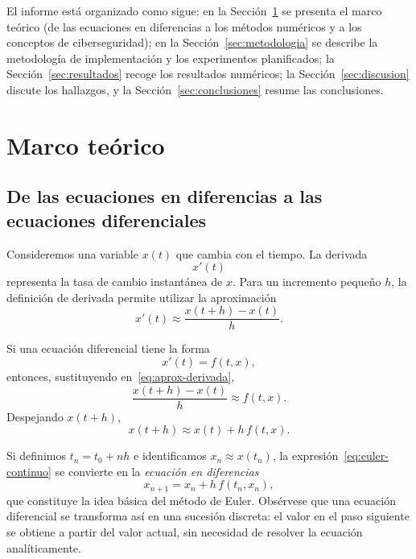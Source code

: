 \documentclass[11pt,a4paper]{article}
\begin{document}
El informe está organizado como sigue: en la Sección~\ref{sec:marco} se
presenta el marco teórico (de las ecuaciones en diferencias a los métodos
numéricos y a los conceptos de ciberseguridad); en la
Sección~\ref{sec:metodologia} se describe la metodología de implementación y
los experimentos planificados; la Sección~\ref{sec:resultados} recoge los
resultados numéricos; la Sección~\ref{sec:discusion} discute los hallazgos, y
la Sección~\ref{sec:conclusiones} resume las conclusiones.

\section{Marco teórico}
\label{sec:marco}

\subsection{De las ecuaciones en diferencias a las ecuaciones diferenciales}
\label{sec:marco-diferencias}

Consideremos una variable $x(t)$ que cambia con el tiempo. La derivada
\begin{equation}
  x'(t)
\end{equation}
representa la tasa de cambio instantánea de $x$. Para un incremento pequeño
$h$, la definición de derivada permite utilizar la aproximación
\begin{equation}
  x'(t) \approx \frac{x(t+h) - x(t)}{h}.
  \label{eq:aprox-derivada}
\end{equation}

Si una ecuación diferencial tiene la forma
\begin{equation}
  x'(t) = f(t, x),
  \label{eq:edo}
\end{equation}
entonces, sustituyendo en~\eqref{eq:aprox-derivada},
\begin{equation}
  \frac{x(t+h) - x(t)}{h} \approx f(t, x).
\end{equation}
Despejando $x(t+h)$,
\begin{equation}
  x(t+h) \approx x(t) + h\, f(t, x).
  \label{eq:euler-continuo}
\end{equation}

Si definimos $t_n = t_0 + nh$ e identificamos $x_n \approx x(t_n)$,
la expresión~\eqref{eq:euler-continuo} se convierte en la \emph{ecuación en
diferencias}
\begin{equation}
  x_{n+1} = x_n + h\, f(t_n, x_n),
  \label{eq:euler-discreto}
\end{equation}
que constituye la idea básica del método de Euler. Obsérvese que una ecuación
diferencial se transforma así en una sucesión discreta: el valor en el paso
siguiente se obtiene a partir del valor actual, sin necesidad de resolver la
ecuación analíticamente.
\end{document}
